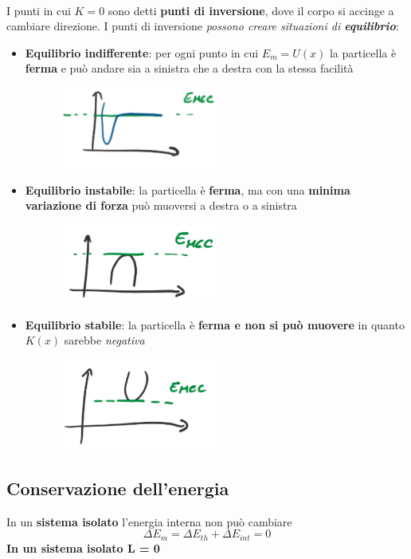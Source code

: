 \documentclass[12pt]{article}
\begin{document}
    \paragraph{} I punti in cui $K=0$ sono detti \textbf{punti di inversione}, dove il corpo si accinge a cambiare direzione. I punti di inversione \textit{possono creare situazioni di \textbf{equilibrio}}:
    \begin{itemize}
        \item \textbf{Equilibrio indifferente}: per ogni punto in cui $E_m = U(x)$ la particella è \textbf{ferma} e può andare sia a sinistra che a destra con la stessa facilità
        \FloatBarrier
        \begin{figure}[!htb]
            \centering
            \includegraphics[width=0.5\textwidth]{graph3.PNG}
        \end{figure}
        \FloatBarrier
        \item \textbf{Equilibrio instabile}: la particella è \textbf{ferma}, ma con una \textbf{minima variazione di forza} può muoversi a destra o a sinistra
        \FloatBarrier
        \begin{figure}[!htb]
            \centering
            \includegraphics[width=0.5\textwidth]{graph4.PNG}
        \end{figure}
        \FloatBarrier
        \item \textbf{Equilibrio stabile}: la particella è \textbf{ferma e non si può muovere} in quanto $K(x)$ sarebbe \textit{negativa}
        \FloatBarrier
        \begin{figure}[!htb]
            \centering
            \includegraphics[width=0.5\textwidth]{graph5.PNG}
        \end{figure}
        \FloatBarrier
    \end{itemize}
    \subsection{Conservazione dell'energia}
    In un \textbf{sistema isolato} l'energia interna non può cambiare
    $$\Delta E_m = \Delta E_{th} + \Delta E_{int} = 0$$
    \textbf{In un sistema isolato L = 0}
\end{document}
